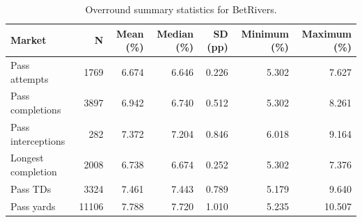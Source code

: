 \begin{table}
\caption{Overround summary statistics for BetRivers.}
\label{tab:overround_betrivers}
\begin{tabular}{lrrrrrr}
\toprule
Market & N & Mean (\%) & Median (\%) & SD (pp) & Minimum (\%) & Maximum (\%) \\
\midrule
Pass attempts & 1769 & 6.674 & 6.646 & 0.226 & 5.302 & 7.627 \\
Pass completions & 3897 & 6.942 & 6.740 & 0.512 & 5.302 & 8.261 \\
Pass interceptions & 282 & 7.372 & 7.204 & 0.846 & 6.018 & 9.164 \\
Longest completion & 2008 & 6.738 & 6.674 & 0.252 & 5.302 & 7.376 \\
Pass TDs & 3324 & 7.461 & 7.443 & 0.789 & 5.179 & 9.640 \\
Pass yards & 11106 & 7.788 & 7.720 & 1.010 & 5.235 & 10.507 \\
\bottomrule
\end{tabular}
\end{table}
